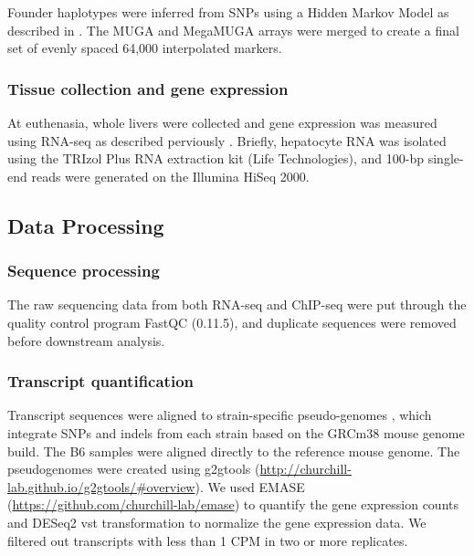 \documentclass[
  11pt,
]{article}
\begin{document}
Founder haplotypes were inferred from SNPs using a Hidden Markov Model
as described in \citet{Gatti:2014ko}. The MUGA and MegaMUGA arrays were
merged to create a final set of evenly spaced 64,000 interpolated
markers.

\hypertarget{tissue-collection-and-gene-expression}{%
\subsubsection{Tissue collection and gene
expression}\label{tissue-collection-and-gene-expression}}

At euthenasia, whole livers were collected and gene expression was
measured using RNA-seq as described perviously
\citep{pmid27309819, pmid28592500}. Briefly, hepatocyte RNA was isolated
using the TRIzol Plus RNA extraction kit (Life Technologies), and 100-bp
single-end reads were generated on the Illumina HiSeq 2000.

\hypertarget{data-processing}{%
\subsection{Data Processing}\label{data-processing}}

\hypertarget{sequence-processing}{%
\subsubsection{Sequence processing}\label{sequence-processing}}

The raw sequencing data from both RNA-seq and ChIP-seq were put through
the quality control program FastQC (0.11.5), and duplicate sequences
were removed before downstream analysis.

\hypertarget{transcript-quantification}{%
\subsubsection{Transcript
quantification}\label{transcript-quantification}}

Transcript sequences were aligned to strain-specific pseudo-genomes
\citep{pmid27309819}, which integrate SNPs and indels from each strain
based on the GRCm38 mouse genome build. The B6 samples were aligned
directly to the reference mouse genome. The pseudogenomes were created
using g2gtools
(\url{http://churchill-lab.github.io/g2gtools/#overview}). We used EMASE
(\url{https://github.com/churchill-lab/emase}) \citep{pmid29444201} to
quantify the gene expression counts and DESeq2 vst transformation
\citep{love2014moderated} to normalize the gene expression data. We
filtered out transcripts with less than 1 CPM in two or more replicates.
\end{document}
